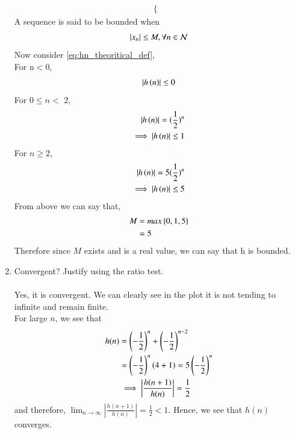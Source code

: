 \documentclass[journal,12pt,twocolumn]{IEEEtran}
\renewcommand\thesection{\arabic{section}}
\begin{document}
\begin{enumerate}[label=\thesection.\arabic*]
\begin{align}
\begin{cases}
				  \end{cases}\label{eq:hn_theoritical_def}
\end{align}
A sequence is said to be bounded when 
\begin{align}
	\left\vert x_n\right\vert \leq M , \forall n \in \mathcal{N}\label{def:bounded_seq_def}
\end{align}  
Now consider \eqref{eq:hn_theoritical_def},\\
For n$<$0,
\begin{equation}
	\left\vert h\left(n\right)\right\vert \leq 0
\end{equation}
For $0 \leq n <$ 2,
\begin{align}
	\left\vert h\left(n\right)\right\vert = (\frac{1}{2})^n\\
	\implies \left\vert h\left(n\right)\right\vert \leq 1
\end{align}
For $n\geq 2$,
\begin{align}
	\left\vert h\left(n\right)\right\vert = 5(\frac{1}{2})^n\\
	\implies \left\vert h\left(n\right)\right\vert \leq 5
\end{align}
From above we can say that,
      \begin{align}
        M &= max\left\{0,1,5\right\} \\
          &= 5\label{eq:hn_bounded_proof}
      \end{align}
Therefore since $M$ exists and is a real value, we can say that h is bounded.

\item Convergent? Justify using the ratio test.
\\
\solution 
\\Yes, it is convergent. We can clearly see in the plot it is not tending to infinite and remain finite.
\\
For large $n$, we see that 
\begin{align}
	h(n) &= \left(-\frac{1}{2}\right)^n + \left(-\frac{1}{2}\right)^{n - 2} \\
		 &= \left(-\frac{1}{2}\right)^{n}\left(4 + 1\right) = 5\left(-\frac{1}{2}\right)^n \\
		 &\implies \left|\frac{h(n + 1)}{h(n)}\right| = \frac{1}{2}
\end{align}
and therefore, $\lim_{n \to \infty}\left|\frac{h(n + 1)}{h(n)}\right| = \frac{1}{2} < 1$. Hence, we see that $h(n)$ converges.
\\


\end{enumerate}
\end{document}
